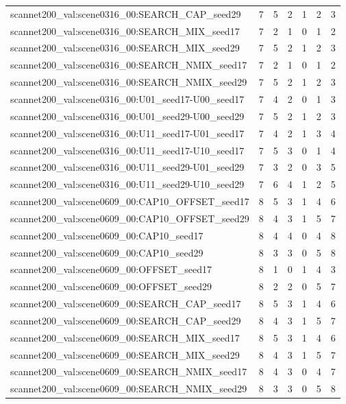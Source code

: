 \begin{table}[t]
\begin{tabular}{lrrrrrr}
scannet200\_val:scene0316\_00:SEARCH\_CAP\_seed29 & 7 & 5 & 2 & 1 & 2 & 3 \\
scannet200\_val:scene0316\_00:SEARCH\_MIX\_seed17 & 7 & 2 & 1 & 0 & 1 & 2 \\
scannet200\_val:scene0316\_00:SEARCH\_MIX\_seed29 & 7 & 5 & 2 & 1 & 2 & 3 \\
scannet200\_val:scene0316\_00:SEARCH\_NMIX\_seed17 & 7 & 2 & 1 & 0 & 1 & 2 \\
scannet200\_val:scene0316\_00:SEARCH\_NMIX\_seed29 & 7 & 5 & 2 & 1 & 2 & 3 \\
scannet200\_val:scene0316\_00:U01\_seed17-U00\_seed17 & 7 & 4 & 2 & 0 & 1 & 3 \\
scannet200\_val:scene0316\_00:U01\_seed29-U00\_seed29 & 7 & 5 & 2 & 1 & 2 & 3 \\
scannet200\_val:scene0316\_00:U11\_seed17-U01\_seed17 & 7 & 4 & 2 & 1 & 3 & 4 \\
scannet200\_val:scene0316\_00:U11\_seed17-U10\_seed17 & 7 & 5 & 3 & 0 & 1 & 4 \\
scannet200\_val:scene0316\_00:U11\_seed29-U01\_seed29 & 7 & 3 & 2 & 0 & 3 & 5 \\
scannet200\_val:scene0316\_00:U11\_seed29-U10\_seed29 & 7 & 6 & 4 & 1 & 2 & 5 \\
scannet200\_val:scene0609\_00:CAP10\_OFFSET\_seed17 & 8 & 5 & 3 & 1 & 4 & 6 \\
scannet200\_val:scene0609\_00:CAP10\_OFFSET\_seed29 & 8 & 4 & 3 & 1 & 5 & 7 \\
scannet200\_val:scene0609\_00:CAP10\_seed17 & 8 & 4 & 4 & 0 & 4 & 8 \\
scannet200\_val:scene0609\_00:CAP10\_seed29 & 8 & 3 & 3 & 0 & 5 & 8 \\
scannet200\_val:scene0609\_00:OFFSET\_seed17 & 8 & 1 & 0 & 1 & 4 & 3 \\
scannet200\_val:scene0609\_00:OFFSET\_seed29 & 8 & 2 & 2 & 0 & 5 & 7 \\
scannet200\_val:scene0609\_00:SEARCH\_CAP\_seed17 & 8 & 5 & 3 & 1 & 4 & 6 \\
scannet200\_val:scene0609\_00:SEARCH\_CAP\_seed29 & 8 & 4 & 3 & 1 & 5 & 7 \\
scannet200\_val:scene0609\_00:SEARCH\_MIX\_seed17 & 8 & 5 & 3 & 1 & 4 & 6 \\
scannet200\_val:scene0609\_00:SEARCH\_MIX\_seed29 & 8 & 4 & 3 & 1 & 5 & 7 \\
scannet200\_val:scene0609\_00:SEARCH\_NMIX\_seed17 & 8 & 4 & 3 & 0 & 4 & 7 \\
scannet200\_val:scene0609\_00:SEARCH\_NMIX\_seed29 & 8 & 3 & 3 & 0 & 5 & 8 \\

\end{tabular}
\end{table}
